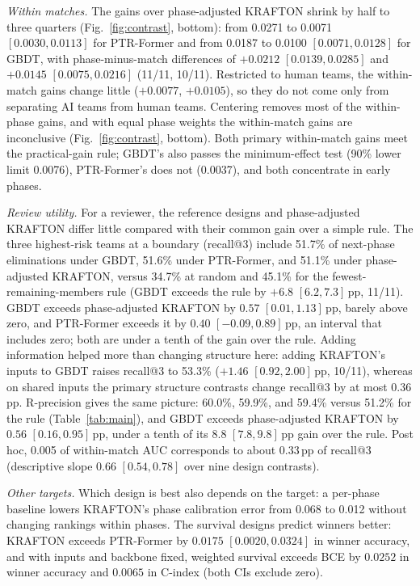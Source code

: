 \documentclass[sigconf,anonymous]{acmart}
\begin{document}
\emph{Within matches.} The gains over phase-adjusted KRAFTON shrink by half to three quarters (Fig.~\ref{fig:contrast}, bottom): from 0.0271 to 0.0071 $[0.0030,\allowbreak 0.0113]$ for PTR-Former and from 0.0187 to 0.0100 $[0.0071,\allowbreak 0.0128]$ for GBDT, with phase-minus-match differences of $+0.0212$ $[0.0139,\allowbreak 0.0285]$ and $+0.0145$ $[0.0075,\allowbreak 0.0216]$ (11/11, 10/11). Restricted to human teams, the within-match gains change little ($+0.0077$, $+0.0105$), so they do not come only from separating AI teams from human teams. Centering removes most of the within-phase gains, and with equal phase weights the within-match gains are inconclusive (Fig.~\ref{fig:contrast}, bottom). Both primary within-match gains meet the practical-gain rule; GBDT's also passes the minimum-effect test (90\% lower limit 0.0076), PTR-Former's does not (0.0037), and both concentrate in early phases.

\emph{Review utility.} For a reviewer, the reference designs and phase-adjusted KRAFTON differ little compared with their common gain over a simple rule. The three highest-risk teams at a boundary (recall@3) include 51.7\% of next-phase eliminations under GBDT, 51.6\% under PTR-Former, and 51.1\% under phase-adjusted KRAFTON, versus 34.7\% at random and 45.1\% for the fewest-remaining-members rule (GBDT exceeds the rule by $+6.8$ $[6.2,\allowbreak 7.3]$\,pp, 11/11). GBDT exceeds phase-adjusted KRAFTON by $0.57$ $[0.01,\allowbreak 1.13]$\,pp, barely above zero, and PTR-Former exceeds it by $0.40$ $[-0.09,\allowbreak 0.89]$\,pp, an interval that includes zero; both are under a tenth of the gain over the rule. Adding information helped more than changing structure here: adding KRAFTON's inputs to GBDT raises recall@3 to 53.3\% ($+1.46$ $[0.92,\allowbreak 2.00]$\,pp, 10/11), whereas on shared inputs the primary structure contrasts change recall@3 by at most 0.36\,pp. R-precision gives the same picture: 60.0\%, 59.9\%, and 59.4\% versus 51.2\% for the rule (Table~\ref{tab:main}), and GBDT exceeds phase-adjusted KRAFTON by $0.56$ $[0.16,\allowbreak 0.95]$\,pp, under a tenth of its $8.8$ $[7.8,\allowbreak 9.8]$\,pp gain over the rule. Post hoc, 0.005 of within-match AUC corresponds to about 0.33\,pp of recall@3 (descriptive slope 0.66 $[0.54,\allowbreak 0.78]$ over nine design contrasts).

\emph{Other targets.} Which design is best also depends on the target: a per-phase baseline lowers KRAFTON's phase calibration error from 0.068 to 0.012 without changing rankings within phases. The survival designs predict winners better: KRAFTON exceeds PTR-Former by $0.0175$ $[0.0020,\allowbreak 0.0324]$ in winner accuracy, and with inputs and backbone fixed, weighted survival exceeds BCE by $0.0252$ in winner accuracy and $0.0065$ in C-index (both CIs exclude zero).
\end{document}
